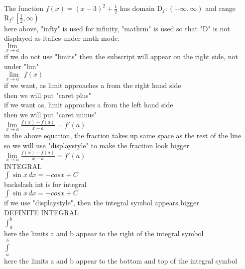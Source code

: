 \documentclass[11pt]{article}
\begin{document}
The function $f(x)=(x-3)^2+\frac{1}{2}$ has domain $\mathrm{D}_f:(-\infty, \infty)$ and range $\mathrm{R}_f:\left[\frac{1}{2}, \infty\right) $
\\
here above, "infty" is used for infinity, "mathrm" is used so that "D" is not displayed as italics under math mode.\\



$\lim \limits_{x \to a}$\\
if we do not use "limits" then the subscript will appear on the right side, not under "lim"\\

$\lim \limits_{x \to a^-}f(x)$\\
if we want, as limit approaches a from the right hand side\\
then we will put "caret plus"\\
if we want as, limit approches a from the left hand side\\
then we will put "caret minus"\\

$\lim \limits_{x \to a} \frac{f(x)-f(a)}{x-a}=f'(a)$\\
in the above equation, the fraction takes up same space as the rest of the line\\
so we will use "displaystyle" to make the fraction look bigger\\

$\displaystyle{\lim \limits_{x \to a} \frac{f(x)-f(a)}{x-a}=f'(a)}$\\


INTEGRAL\\

$\int \sin x \,dx=-cos x + C$\\
backslash int is for integral\\

$\displaystyle{\int \sin x \,dx=-cos x + C}$\\
if we use "displaystyle", then the integral symbol appears bigger\\


DEFINITE INTEGRAL\\

$\int_a^b$\\
here the limits a and b appear to the right of the integral symbol\\

$\int \limits_a^b$\\
here the limits a and b appear to the bottom and top of the integral symbol\\
\end{document}
